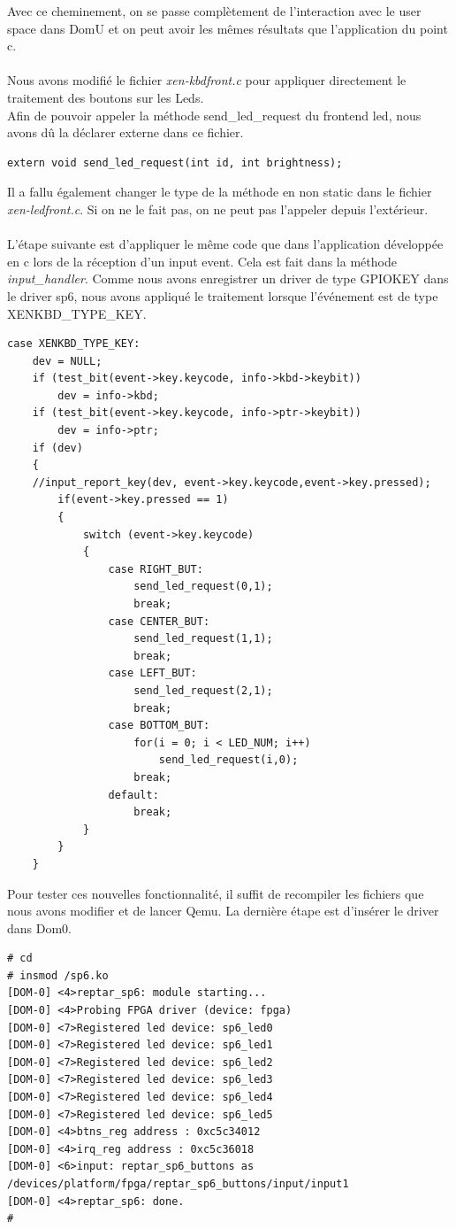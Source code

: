Avec ce cheminement, on se passe complètement de l'interaction avec le user space dans DomU et on peut avoir les mêmes résultats que l'application du point c.\\\\
Nous avons modifié le fichier \textit{xen-kbdfront.c} pour appliquer directement le traitement des boutons sur les Leds.\\
Afin de pouvoir appeler la méthode send\_led\_request du frontend led, nous avons dû la déclarer externe dans ce fichier.
\begin{lstlisting}
extern void send_led_request(int id, int brightness);
\end{lstlisting}
Il a fallu également changer le type de la méthode en non static dans le fichier \textit{xen-ledfront.c}. Si on ne le fait pas, on ne peut pas l'appeler depuis l'extérieur.\\\\
L'étape suivante est d'appliquer le même code que dans l'application développée en c lors de la réception d'un input event. Cela est fait dans la méthode \textit{input\_handler}. Comme nous avons enregistrer un driver de type GPIOKEY dans le driver sp6, nous avons appliqué le traitement lorsque l'événement est de type XENKBD\_TYPE\_KEY.
\begin{lstlisting}
case XENKBD_TYPE_KEY:
	dev = NULL;
	if (test_bit(event->key.keycode, info->kbd->keybit))
		dev = info->kbd;
	if (test_bit(event->key.keycode, info->ptr->keybit))
		dev = info->ptr;
	if (dev)
	{
	//input_report_key(dev, event->key.keycode,event->key.pressed);
		if(event->key.pressed == 1)
		{
			switch (event->key.keycode) 
			{
				case RIGHT_BUT:
					send_led_request(0,1);
					break;
				case CENTER_BUT:
					send_led_request(1,1);
					break;
				case LEFT_BUT:
					send_led_request(2,1);
					break;
				case BOTTOM_BUT:
					for(i = 0; i < LED_NUM; i++)
						send_led_request(i,0);
					break;
				default:
					break;
			}
		}
	}
\end{lstlisting}
Pour tester ces nouvelles fonctionnalité, il suffit de recompiler les fichiers que nous avons modifier et de lancer Qemu. La dernière étape est d'insérer le driver dans Dom0.
\begin{lstlisting}
# cd
# insmod /sp6.ko 
[DOM-0] <4>reptar_sp6: module starting...
[DOM-0] <4>Probing FPGA driver (device: fpga)
[DOM-0] <7>Registered led device: sp6_led0
[DOM-0] <7>Registered led device: sp6_led1
[DOM-0] <7>Registered led device: sp6_led2
[DOM-0] <7>Registered led device: sp6_led3
[DOM-0] <7>Registered led device: sp6_led4
[DOM-0] <7>Registered led device: sp6_led5
[DOM-0] <4>btns_reg address : 0xc5c34012
[DOM-0] <4>irq_reg address : 0xc5c36018
[DOM-0] <6>input: reptar_sp6_buttons as /devices/platform/fpga/reptar_sp6_buttons/input/input1
[DOM-0] <4>reptar_sp6: done.
# 
\end{lstlisting}
